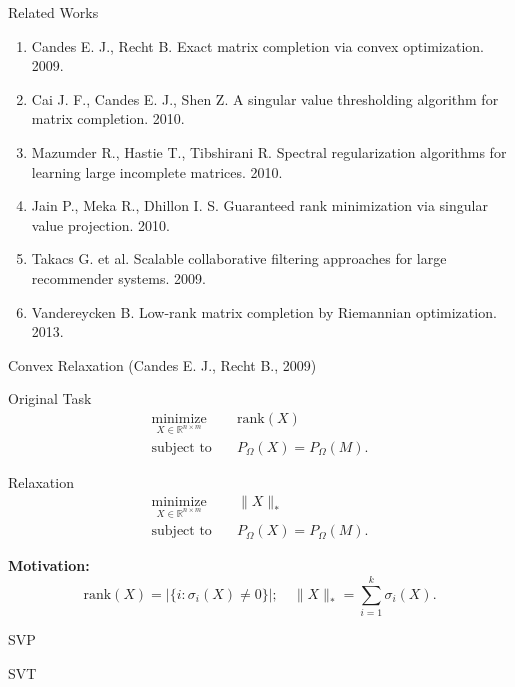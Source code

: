\documentclass{beamer}
\begin{document}
\begin{frame}{Related Works}
	\begin{enumerate}
		\item Candes E. J., Recht B. Exact matrix completion via convex optimization. 2009.
		\item Cai J. F., Candes E. J., Shen Z. A singular value thresholding algorithm for matrix completion. 2010.
		\item Mazumder R., Hastie T., Tibshirani R. Spectral regularization algorithms for learning large incomplete matrices. 2010.
		\item Jain P., Meka R., Dhillon I. S. Guaranteed rank minimization via singular value projection. 2010.
		\item Takacs G. et al. Scalable collaborative filtering approaches for large recommender systems. 2009.
		\item Vandereycken B. Low-rank matrix completion by Riemannian optimization. 2013.
	\end{enumerate}
\end{frame}
\begin{frame}{Convex Relaxation (Candes E. J., Recht B., 2009)}
\begin{block}{Original Task}
	\begin{align*}
	\mathop{\text{minimize}}\limits_{X \in \mathbb{R}^{n \times m}} \quad & 
	\text{rank} (X) \\
	\text{subject to} \quad & P_{\Omega} (X) = P_{\Omega} (M).
	\end{align*}
\end{block}
\begin{block}{Relaxation}
	\begin{align*}
	\mathop{\text{minimize}}\limits_{X \in \mathbb{R}^{n \times m}} \quad & 
	\| X \|_* \\
	\text{subject to} \quad & P_{\Omega} (X) = P_{\Omega} (M).
	\end{align*}
\end{block}
\textbf{Motivation:}
$$
	\text{rank} (X) = |\{ i: \sigma_i(X) \neq 0\}|; \quad 
	\| X \|_* = \sum_{i=1}^{k} \sigma_i(X).
$$
\end{frame}
\begin{frame}{SVP}
\end{frame}
\begin{frame}{SVT}
\end{frame}
\end{document}

